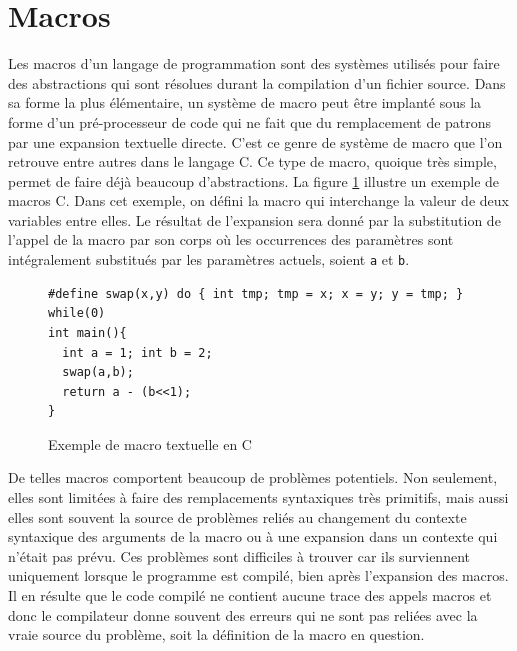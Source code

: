 \documentclass[12pt,twoside,letterpaper,francais]{book}
\newcommand{\scheme}[1]{\selectlanguage{english}{\tt #1}\selectlanguage{french}}
\begin{document}
\section{Macros} \label{Scheme:macros}
Les macros d'un langage de programmation sont des systèmes utilisés
pour faire des abstractions qui sont résolues durant la compilation
d'un fichier source. Dans sa forme la plus élémentaire, un système de
macro peut être implanté sous la forme d'un pré-processeur de code qui
ne fait que du remplacement de patrons par une expansion textuelle
directe. C'est ce genre de système de macro que l'on retrouve entre
autres dans le langage C. Ce type de macro, quoique très simple,
permet de faire déjà beaucoup d'abstractions. La figure
\ref{Scheme:c-macros} illustre un exemple de macros C. Dans cet
exemple, on défini la macro \scheme{swap} qui interchange la valeur de
deux variables entre elles. Le résultat de l'expansion sera donné par
la substitution de l'appel de la macro par son corps où les
occurrences des paramètres sont intégralement substitués par les
paramètres actuels, soient \texttt{a} et \texttt{b}.

\begin{figure}[htb!]
  \begin{verbatim}
#define swap(x,y) do { int tmp; tmp = x; x = y; y = tmp; } while(0)
int main(){
  int a = 1; int b = 2;
  swap(a,b);
  return a - (b<<1);
}
  \end{verbatim}
  \caption{Exemple de macro textuelle en C}
  \label{Scheme:c-macros}
\end{figure}

De telles macros comportent beaucoup de problèmes potentiels. Non
seulement, elles sont limitées à faire des remplacements syntaxiques
très primitifs, mais aussi elles sont souvent la source de problèmes
reliés au changement du contexte syntaxique des arguments de la macro
ou à une expansion dans un contexte qui n'était pas prévu. Ces
problèmes sont difficiles à trouver car ils surviennent uniquement
lorsque le programme est compilé, bien après l'expansion des
macros. Il en résulte que le code compilé ne contient aucune trace des
appels macros et donc le compilateur donne souvent des erreurs qui ne
sont pas reliées avec la vraie source du problème, soit la définition
de la macro en question.
\end{document}
